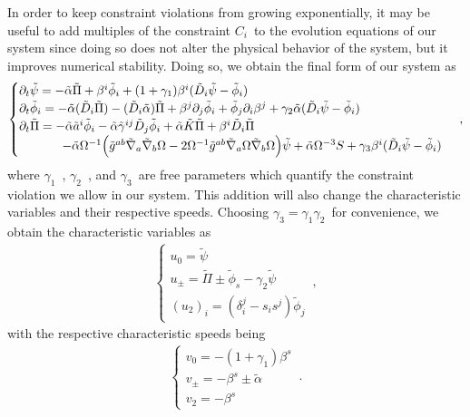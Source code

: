 In order to keep constraint violations from growing exponentially, it may be useful to add multiples of the constraint $C_i$~to the evolution equations of our system since doing so does not alter the physical behavior of the system, but it improves numerical stability. Doing so, we obtain the final form of our system as
%
\begin{align}
    \begin{cases}
        \partial_t \tilde{\psi} = - \tilde{\alpha} \tilde{\Pi} + \beta^i \tilde{\phi}_i + (1 + \gamma_1) \beta^i (\tilde{D}_i \tilde{\psi} - \tilde{\phi}_i) \\
        \partial_t \tilde{\phi}_i = - \tilde{\alpha} (\tilde{D}_i \tilde{\Pi}) - (\tilde{D}_i \tilde{\alpha}) \tilde{\Pi} + \beta^j \partial_j \tilde{\phi}_i + \tilde{\phi}_j \partial_i \beta^j + \gamma_2 \tilde{\alpha} (\tilde{D}_i \tilde{\psi} - \tilde{\phi}_i) \\
        \partial_t \tilde{\Pi} = - \tilde{\alpha} \tilde{a}^i \tilde{\phi}_i - \tilde{\alpha} \tilde{\gamma}^{ij} \tilde{D}_j \tilde{\phi}_i + \tilde{\alpha} \tilde{K} \tilde{\Pi} + \beta^i \tilde{D}_i \tilde{\Pi} \\
        \hspace{3.5em} - \tilde{\alpha} \Omega^{-1} \Big( \tilde{g}^{ab} \tilde{\nabla}_a \tilde{\nabla}_b \Omega - 2 \Omega^{-1} \tilde{g}^{ab} \tilde{\nabla}_a \Omega \tilde{\nabla}_b \Omega \Big) \tilde{\psi} + \tilde{\alpha} \Omega^{-3} S + \gamma_3 \beta^i (\tilde{D}_i \tilde{\psi} - \tilde{\phi}_i)
    \end{cases}\,,
    \label{eq:wave_equation_constraint_violation}
\end{align}
%
where $\gamma_1$~, $\gamma_2$~, and $\gamma_3$~are free parameters which quantify the constraint violation we allow in our system. This addition will also change the characteristic variables and their respective speeds. Choosing $\gamma_3 = \gamma_1 \gamma_2$~for convenience, we obtain the characteristic variables as
%
\begin{align}
    \begin{cases}
        u_0 = \tilde{\psi} \\
        u_\pm = \tilde{\Pi} \pm \tilde{\phi}_s - \gamma_2 \tilde{\psi} \\
        (u_2)_i = (\delta_i^j - s_i s^j) \tilde{\phi}_j
    \end{cases}\,,
\end{align}
%
with the respective characteristic speeds being
%
\begin{align}
    \begin{cases}
        v_0 = - (1 + \gamma_1) \beta^s \\
        v_\pm = -\beta^s \pm \tilde{\alpha} \\
        v_2 = -\beta^s
    \end{cases}\,.
\end{align}


